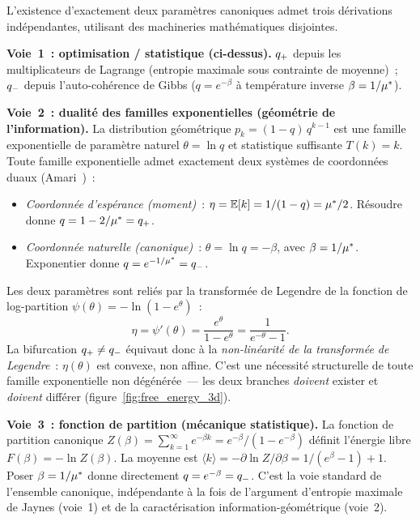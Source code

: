 \documentclass[12pt,a4paper]{article}
\begin{document}
\begin{remarque}
\label{rem:bifurcation_routes}
L'existence d'exactement deux paramètres canoniques admet trois
dérivations indépendantes, utilisant des machineries mathématiques
disjointes.

\textbf{Voie~1~: optimisation / statistique (ci-dessus).}
$q_{+}$ depuis les multiplicateurs de Lagrange (entropie maximale
sous contrainte de moyenne)~; $q_{-}$ depuis l'auto-cohérence de
Gibbs ($q = e^{-\beta}$ à température inverse $\beta = 1/{\mu^{*}}$).

\textbf{Voie~2~: dualité des familles exponentielles (géométrie de
l'information).}
La distribution géométrique $p_k = (1-q)\,q^{k-1}$ est une famille
exponentielle de paramètre naturel $\theta = \ln q$ et statistique
suffisante $T(k) = k$. Toute famille exponentielle admet exactement
deux systèmes de coordonnées duaux (Amari~\cite{Amari2016})~:
\begin{itemize}[nosep]
\item \emph{Coordonnée d'espérance (moment)}~:
  $\eta = \mathbb{E}[k] = 1/(1-q) = {\mu^{*}}/2$.
  Résoudre donne $q = 1 - 2/{\mu^{*}} = q_{+}$.
\item \emph{Coordonnée naturelle (canonique)}~:
  $\theta = \ln q = -\beta$, avec $\beta = 1/{\mu^{*}}$.
  Exponentier donne $q = e^{-1/{\mu^{*}}} = q_{-}$.
\end{itemize}
Les deux paramètres sont reliés par la transformée de Legendre de la
fonction de log-partition $\psi(\theta) = -\ln(1 - e^\theta)$~:
\begin{equation}
  \eta = \psi'(\theta) = \frac{e^\theta}{1 - e^\theta}
       = \frac{1}{e^{-\theta} - 1}.
  \label{eq:legendre_duality}
\end{equation}
La bifurcation $q_{+} \neq q_{-}$ équivaut donc à la
\emph{non-linéarité de la transformée de Legendre}~: $\eta(\theta)$
est convexe, non affine. C'est une nécessité structurelle de toute
famille exponentielle non dégénérée~--- les deux branches
\emph{doivent} exister et \emph{doivent} différer
(figure~\ref{fig:free_energy_3d}).

\textbf{Voie~3~: fonction de partition (mécanique statistique).}
La fonction de partition canonique
$Z(\beta) = \sum_{k=1}^\infty e^{-\beta k} = e^{-\beta}/(1-e^{-\beta})$
définit l'énergie libre $F(\beta) = -\ln Z(\beta)$. La moyenne est
$\langle k \rangle = -\partial \ln Z / \partial\beta = 1/(e^\beta - 1) + 1$.
Poser $\beta = 1/{\mu^{*}}$ donne directement $q = e^{-\beta} = q_{-}$.
C'est la voie standard de l'ensemble canonique, indépendante à la
fois de l'argument d'entropie maximale de Jaynes (voie~1) et de la
caractérisation information-géométrique (voie~2).


\end{remarque}
\end{document}
